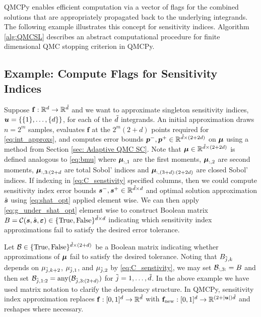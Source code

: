\documentclass{article}
\begin{document}
QMCPy enables efficient computation via a vector of flags for the combined solutions that are appropriately propagated back to the underlying integrands. The following example illustrates this concept for sensitivity indices. Algorithm \ref{alg:QMCSL} describes an abstract computational procedure for finite dimensional QMC stopping criterion in QMCPy. 

\subsection{Example: Compute Flags for Sensitivity Indices} 


Suppose $\mathbf{f}:\mathbb{R}^d \to \mathbb{R}^{\tilde{d}}$ and we want to approximate singleton sensitivity indices, $\boldsymbol{u} = \{ \{1\}, \dots, \{d\} \}$, for each of the $\tilde{d}$ integrands. An initial approximation draws $n=2^m$ samples, evaluates $\mathbf{f}$ at the $2^m(2+d)$ points required for \eqref{eq:int_approxs}, and computes error bounds $\boldsymbol{p}^-,\boldsymbol{p}^+ \in \mathbb{R}^{\tilde{d} \times (2+2d)}$ on $\boldsymbol{\mu}$ using a method from  Section \ref{sec: Adaptive QMC SC}. Note that $\boldsymbol{\mu} \in \mathbb{R}^{\tilde{d} \times (2+2d)}$ is defined analogous to \eqref{eq:bmu} where $\boldsymbol{\mu}_{:,1}$ are the first moments, $\boldsymbol{\mu}_{:,2}$ are second moments, $\boldsymbol{\mu}_{:,3:(2+d}$ are total Sobol' indices and $\boldsymbol{\mu}_{:,(3+d):(2+2d)}$ are closed Sobol' indices. If indexing in \eqref{eq:C_senstivity} specified columns, then we could compute sensitivity index error bounds $\boldsymbol{s}^-,\boldsymbol{s}^+ \in \mathbb{R}^{\tilde{d} \times d}$ and optimal solution approximation $\hat{\boldsymbol{s}}$ using \eqref{eq:shat_opt} applied element wise.  We can then apply \eqref{eq:g_under_shat_opt} element wise to construct Boolean matrix $B = \mathcal{C}(\boldsymbol{s},\hat{\boldsymbol{s}},\boldsymbol{\varepsilon}) \in \{\text{True},\text{False}\}^{\tilde{d} \times d}$ indicating which sensitivity index approximations fail to satisfy the desired error tolerance. 

Let $\mathcal{B} \in \{\text{True},\text{False}\}^{\tilde{d} \times (2+d)}$ be a Boolean matrix indicating whether approximations of $\boldsymbol{\mu}$ fail to satisfy the desired tolerance. Noting that $B_{\tilde{j},k}$  depends on $\mu_{\tilde{j},k+2}$, $\mu_{\tilde{j},1}$, and $\mu_{\tilde{j},2}$ by \eqref{eq:C_senstivity}, we may set $\mathcal{B}_{:,3:}=B$ and then set $\mathcal{B}_{\tilde{j},1:2} = \text{any}(\mathcal{B}_{\tilde{j},3:(2+d)})$ for $\tilde{j}=1,\dots,\tilde{d}$. In the above example we have used matrix notation to clarify the dependency structure. In QMCPy, sensitivity index approximation replaces 
$\mathbf{f} : [0,1]^d \to \mathbb{R}^{\tilde{d}}$ with
$\mathbf{f}_{\text{new}}: [0,1]^d \to \mathbb{R}^{(2+\lvert \boldsymbol{u} \rvert)\tilde{d}}$
and reshapes where necessary.
\end{document}
